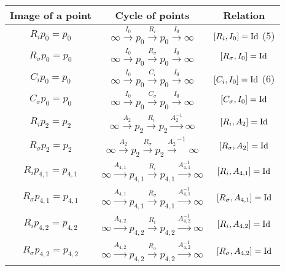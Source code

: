 \documentclass{article}[12pt]
\begin{document}
\begin{table}[h]\label{hurwitztableRC}
  \begin{center}
  {\renewcommand{\arraystretch}{1.2}%
\begin{tabular}{|c|c|c|}
\hline 
Image of a point & Cycle of points & Relation \\
\hline


$R_i p_0=p_0$ & $\infty \xrightarrow{I_0} p_0 \xrightarrow{R_i} p_0 \xrightarrow{I_0}  \infty$& \hfill $[R_i,I_0]={\rm Id}$ \hfill (5)\\
\hline

$R_\sigma p_0=p_0$ & $\infty \xrightarrow{I_0} p_0 \xrightarrow{R_\sigma} p_0 \xrightarrow{I_0}  \infty$& $[R_\sigma,I_0]={\rm Id}$\\
\hline

$C_i p_0=p_0$ & $\infty \xrightarrow{I_0} p_0 \xrightarrow{C_i} p_0 \xrightarrow{I_0}  \infty$& \hfill $[C_i,I_0]={\rm Id}$ \hfill (6)\\
\hline

$C_\sigma p_0=p_0$ & $\infty \xrightarrow{I_0} p_0 \xrightarrow{C_\sigma} p_0 \xrightarrow{I_0}  \infty$& $[C_\sigma,I_0]={\rm Id}$\\
\hline

$R_i p_2=p_2$ & $\infty \xrightarrow{A_2} p_2 \xrightarrow{R_i} p_2 \xrightarrow{A_2^{-1}}  \infty$& $[R_i,A_2]={\rm Id}$\\
\hline

$R_\sigma p_2=p_2$ & $\infty \xrightarrow{A_2} p_2 \xrightarrow{R_\sigma} p_2 \xrightarrow{A_2}^{-1}  \infty$& $[R_\sigma,A_2]={\rm Id}$\\
\hline

$R_i p_{4,1}=p_{4,1}$ & $\infty \xrightarrow{A_{4,1}} p_{4,1} \xrightarrow{R_i} p_{4,1} \xrightarrow{A_{4,1}^{-1}}  \infty$& $[R_i,A_{4,1}]={\rm Id}$\\
\hline

$R_\sigma p_{4,1}=p_{4,1}$ & $\infty \xrightarrow{A_{4,1}} p_{4,1} \xrightarrow{R_\sigma} p_{4,1} \xrightarrow{A_{4,1}^{-1}}  \infty$& $[R_\sigma,A_{4,1}]={\rm Id}$\\
\hline

$R_i p_{4,2}=p_{4,2}$ & $\infty \xrightarrow{A_{4,2}} p_{4,2} \xrightarrow{R_i} p_{4,2} \xrightarrow{A_{4,2}^{-1}}  \infty$& $[R_i,A_{4,2}]={\rm Id}$\\
\hline

$R_\sigma p_{4,2}=p_{4,2}$ & $\infty \xrightarrow{A_{4,2}} p_{4,2} \xrightarrow{R_\sigma} p_{4,2} \xrightarrow{A_{4,2}^{-1}}  \infty$& $[R_\sigma,A_{4,2}]={\rm Id}$\\
\hline


\end{tabular}}
\end{center}
\end{table}
\end{document}
